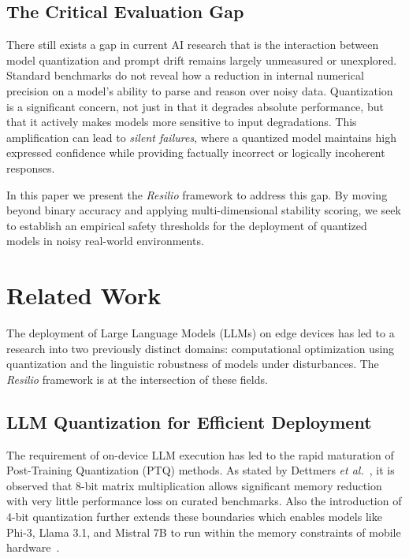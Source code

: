 \documentclass[conference]{IEEEtran}
\begin{document}
\subsection{The Critical Evaluation Gap}

There still exists a gap in current AI research that is the interaction between model quantization and prompt drift remains largely unmeasured or unexplored. Standard benchmarks do not reveal how a reduction in internal numerical precision on a model's ability to parse and reason over noisy data. Quantization is a significant concern, not just in that it degrades absolute performance, but that it actively makes models more sensitive to input degradations. This amplification can lead to \textit{silent failures}, where a quantized model maintains high expressed confidence while providing factually incorrect or logically incoherent responses.

In this paper we present the \textit{Resilio} framework to address this gap. By moving beyond binary accuracy and applying multi-dimensional stability scoring, we seek to establish an empirical safety thresholds for the deployment of quantized models in noisy real-world environments.




\section{Related Work}

The deployment of Large Language Models (LLMs) on edge devices has led to a research into two previously distinct domains: computational optimization using quantization and the linguistic robustness of models under disturbances. The \textit{Resilio} framework is at the intersection of these fields.

\subsection{LLM Quantization for Efficient Deployment}

The requirement of on-device LLM execution has led to the rapid maturation of Post-Training Quantization (PTQ) methods. As stated by Dettmers \textit{et al.}~\cite{ref1}, it is observed that 8-bit matrix multiplication allows significant memory reduction with very little performance loss on curated benchmarks. Also the introduction of 4-bit quantization further extends these boundaries which enables models like Phi-3, Llama 3.1, and Mistral 7B to run within the memory constraints of mobile hardware~\cite{ref2, ref3, ref9}. 
\end{document}
